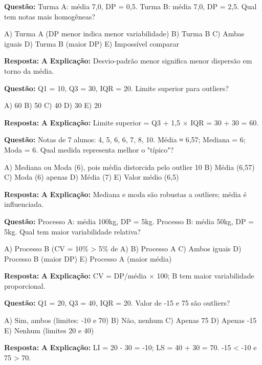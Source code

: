 \begin{SolvedBox}[title=Questão de Fixação 2 - Desvio-Padrão]
\textbf{Questão:} Turma A: média 7,0, DP = 0,5. Turma B: média 7,0, DP = 2,5. Qual tem notas mais homogêneas?

A) Turma A (DP menor indica menor variabilidade)  
B) Turma B  
C) Ambas iguais  
D) Turma B (maior DP)  
E) Impossível comparar

\textbf{Resposta:} \textbf{A}  
\textbf{Explicação:} Desvio-padrão menor significa menor dispersão em torno da média.
\end{SolvedBox}

\begin{SolvedBox}[title=Questão de Fixação 3 - Boxplot e Outliers]
\textbf{Questão:} Q1 = 10, Q3 = 30, IQR = 20. Limite superior para outliers?

A) 60  
B) 50  
C) 40  
D) 30  
E) 20

\textbf{Resposta:} \textbf{A}  
\textbf{Explicação:} Limite superior = Q3 + 1,5 × IQR = 30 + 30 = 60.
\end{SolvedBox}

\begin{SolvedBox}[title=Questão de Fixação 4 - Tendência Central + Outliers]
\textbf{Questão:} Notas de 7 alunos: 4, 5, 6, 6, 7, 8, 10. Média ≈ 6,57; Mediana = 6; Moda = 6. Qual medida representa melhor o "típico"?

A) Mediana ou Moda (6), pois média distorcida pelo outlier 10  
B) Média (6,57)  
C) Moda (6) apenas  
D) Média (7)  
E) Valor médio (6,5)

\textbf{Resposta:} \textbf{A}  
\textbf{Explicação:} Mediana e moda são robustas a outliers; média é influenciada.
\end{SolvedBox}

\begin{SolvedBox}[title=Questão de Fixação 5 - Dispersão: Coeficiente de Variação]
\textbf{Questão:} Processo A: média 100kg, DP = 5kg. Processo B: média 50kg, DP = 5kg. Qual tem maior variabilidade relativa?

A) Processo B (CV = 10\% > 5\% de A)  
B) Processo A  
C) Ambos iguais  
D) Processo B (maior DP)  
E) Processo A (maior média)

\textbf{Resposta:} \textbf{A}  
\textbf{Explicação:} CV = DP/média × 100; B tem maior variabilidade proporcional.
\end{SolvedBox}

\begin{SolvedBox}[title=Questão de Fixação 6 - Boxplot: Limites de Outlier]
\textbf{Questão:} Q1 = 20, Q3 = 40, IQR = 20. Valor de -15 e 75 são outliers?

A) Sim, ambos (limites: -10 e 70)  
B) Não, nenhum  
C) Apenas 75  
D) Apenas -15  
E) Nenhum (limites 20 e 40)

\textbf{Resposta:} \textbf{A}  
\textbf{Explicação:} LI = 20 - 30 = -10; LS = 40 + 30 = 70. -15 < -10 e 75 > 70.
\end{SolvedBox}

